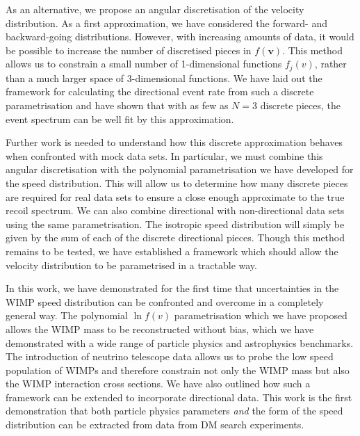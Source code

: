 As an alternative, we propose an angular discretisation of the velocity distribution. As a first approximation, we have considered the forward- and backward-going distributions. However, with increasing amounts of data, it would be possible to increase the number of discretised pieces in $f(\textbf{v})$. This method allows us to constrain a small number of 1-dimensional functions $f_j(v)$, rather than a much larger space of 3-dimensional functions. We have laid out the framework for calculating the directional event rate from such a discrete parametrisation and have shown that with as few as $N=3$ discrete pieces, the event spectrum can be well fit by this approximation. 

Further work is needed to understand how this discrete approximation behaves when confronted with mock data sets. In particular, we must combine this angular discretisation with the polynomial parametrisation we have developed for the speed distribution. This will allow us to determine how many discrete pieces are required for real data sets to ensure a close enough approximate to the true recoil spectrum. We can also combine directional with non-directional data sets using the same parametrisation. The isotropic speed distribution will simply be given by the sum of each of the discrete directional pieces. Though this method remains to be tested, we have established a framework which should allow the velocity distribution to be parametrised in a tractable way.


In this work, we have demonstrated for the first time that uncertainties in the WIMP speed distribution can be confronted and overcome in a completely general way. The polynomial $\ln f(v)$ parametrisation which we have proposed allows the WIMP mass to be reconstructed without bias, which we have demonstrated with a wide range of particle physics and astrophysics benchmarks. The introduction of neutrino telescope data allows us to probe the low speed population of WIMPs and therefore constrain not only the WIMP mass but also the WIMP interaction cross sections. We have also outlined how such a framework can be extended to incorporate directional data. This work is the first demonstration that both particle physics parameters \textit{and} the form of the speed distribution can be extracted from data from DM search experiments. 

 
  

